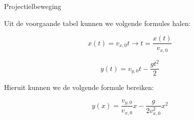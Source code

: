 \begin{app}[Projectielbeweging]{Projectielbeweging}
\begin{center}
    \end{center}
    
    Uit de voorgaande tabel kunnen we volgende formules halen: 
    
        \begin{equation}
            x(t) = v_{x,0}t \to t = \dfrac{x(t)}{v_{x,0}}
        \end{equation}
        
        \begin{equation}
            y(t) = v_{y,0}t - \dfrac{gt^2}{2}
        \end{equation}

    \vspace{0.25cm}
    Hieruit kunnen we de volgende formule bereiken:
    
        \begin{equation}
            y(x) = \dfrac{v_{y,0}}{v_{x,0}}x - \dfrac{g}{2v_{x,0}^2}x^2
        \end{equation}
    
    
\end{app}
